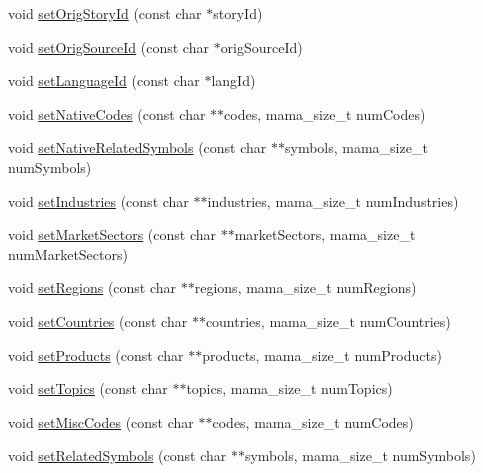 \begin{CompactItemize}
\item 
void \hyperlink{classWombat_1_1MamdaNewsHeadline_4e30f708d50dfb7f96c0f585333e5833}{set\-Orig\-Story\-Id} (const char $\ast$story\-Id)
\item 
void \hyperlink{classWombat_1_1MamdaNewsHeadline_e1d4392103ea5bcc6defab7ddf87bfd0}{set\-Orig\-Source\-Id} (const char $\ast$orig\-Source\-Id)
\item 
void \hyperlink{classWombat_1_1MamdaNewsHeadline_259142c05c41c64535f54477e0e67bfe}{set\-Language\-Id} (const char $\ast$lang\-Id)
\item 
void \hyperlink{classWombat_1_1MamdaNewsHeadline_6a36c1b5a54d35cb8238437511644c07}{set\-Native\-Codes} (const char $\ast$$\ast$codes, mama\_\-size\_\-t num\-Codes)
\item 
void \hyperlink{classWombat_1_1MamdaNewsHeadline_c3bd51323c393438eb4413fa9789737c}{set\-Native\-Related\-Symbols} (const char $\ast$$\ast$symbols, mama\_\-size\_\-t num\-Symbols)
\item 
void \hyperlink{classWombat_1_1MamdaNewsHeadline_9c29cbb416405c1bbaa4a67b23dcafbc}{set\-Industries} (const char $\ast$$\ast$industries, mama\_\-size\_\-t num\-Industries)
\item 
void \hyperlink{classWombat_1_1MamdaNewsHeadline_09c39b8b93bd512fb023b6bb856b009b}{set\-Market\-Sectors} (const char $\ast$$\ast$market\-Sectors, mama\_\-size\_\-t num\-Market\-Sectors)
\item 
void \hyperlink{classWombat_1_1MamdaNewsHeadline_dd9a9b5374502b9038586b5d3333bb69}{set\-Regions} (const char $\ast$$\ast$regions, mama\_\-size\_\-t num\-Regions)
\item 
void \hyperlink{classWombat_1_1MamdaNewsHeadline_1fb1437a61f8262914be4a678a282eb8}{set\-Countries} (const char $\ast$$\ast$countries, mama\_\-size\_\-t num\-Countries)
\item 
void \hyperlink{classWombat_1_1MamdaNewsHeadline_945dfa7210ec4375fad51c8657b0f96c}{set\-Products} (const char $\ast$$\ast$products, mama\_\-size\_\-t num\-Products)
\item 
void \hyperlink{classWombat_1_1MamdaNewsHeadline_ba36d23a26fe7381aa2646834fb8c747}{set\-Topics} (const char $\ast$$\ast$topics, mama\_\-size\_\-t num\-Topics)
\item 
void \hyperlink{classWombat_1_1MamdaNewsHeadline_66581c6c415139a8f34bb1179b4d601e}{set\-Misc\-Codes} (const char $\ast$$\ast$codes, mama\_\-size\_\-t num\-Codes)
\item 
void \hyperlink{classWombat_1_1MamdaNewsHeadline_ebf0896a313c8c2007e1ffdf03f0649f}{set\-Related\-Symbols} (const char $\ast$$\ast$symbols, mama\_\-size\_\-t num\-Symbols)

\end{CompactItemize}
